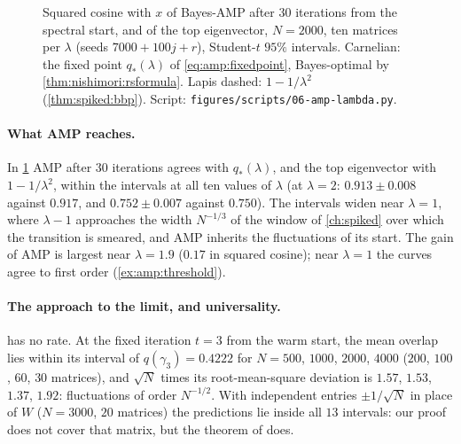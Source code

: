 \begin{refsection}
\begin{figure}[t]
\centering
{}
\caption{Squared cosine with $x$ of Bayes-AMP after $30$ iterations from the spectral start, and of the top eigenvector, $N=2000$, ten matrices per $\lambda$ (seeds $7000+100j+r$), Student-$t$ $95\%$ intervals. Carnelian: the fixed point $q_*(\lambda)$ of \eqref{eq:amp:fixedpoint}, Bayes-optimal by \cref{thm:nishimori:rsformula}. Lapis dashed: $1-1/\lambda^2$ (\cref{thm:spiked:bbp}). Script: \texttt{figures/scripts/06-amp-lambda.py}.}\label{fig:amp:lambda}
\end{figure}

\paragraph{What AMP reaches.} In \cref{fig:amp:lambda} AMP after $30$ iterations agrees with $q_*(\lambda)$, and the top eigenvector with $1-1/\lambda^2$, within the intervals at all ten values of $\lambda$ (at $\lambda=2$: $0.913\pm0.008$ against $0.917$, and $0.752\pm0.007$ against $0.750$). The intervals widen near $\lambda=1$, where $\lambda-1$ approaches the width $N^{-1/3}$ of the window of \cref{ch:spiked} over which the transition is smeared, and AMP inherits the fluctuations of its start. The gain of AMP is largest near $\lambda=1.9$ ($0.17$ in squared cosine); near $\lambda=1$ the curves agree to first order (\cref{ex:amp:threshold}).

\paragraph{The approach to the limit, and universality.}  has no rate. At the fixed iteration $t=3$ from the warm start, the mean overlap lies within its interval of $q(\gamma_3)=0.4222$ for $N=500$, $1000$, $2000$, $4000$ ($200$, $100$, $60$, $30$ matrices), and $\sqrt N$ times its root-mean-square deviation is $1.57$, $1.53$, $1.37$, $1.92$: fluctuations of order $N^{-1/2}$. With independent entries $\pm1/\sqrt N$ in place of $W$ ($N=3000$, $20$ matrices) the predictions lie inside all $13$ intervals: our proof does not cover that matrix, but the theorem of \textcite{ChenLam2021} does.


\end{refsection}
